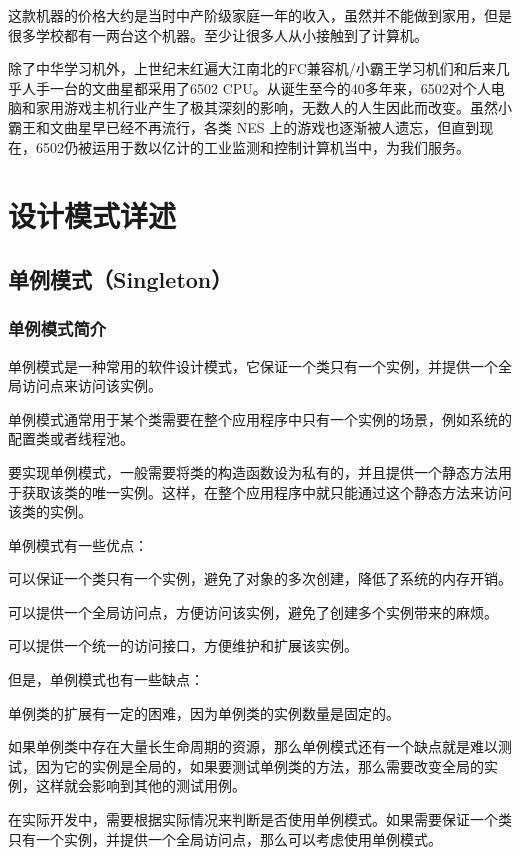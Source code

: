 \documentclass[cn,black,12pt,normal]{elegantnote}
\begin{document}
这款机器的价格大约是当时中产阶级家庭一年的收入，虽然并不能做到家用，但是很多学校都有一两台这个机器。至少让很多人从小接触到了计算机。

除了中华学习机外，上世纪末红遍大江南北的FC兼容机/小霸王学习机们和后来几乎人手一台的文曲星都采用了6502 CPU。从诞生至今的40多年来，6502对个人电脑和家用游戏主机行业产生了极其深刻的影响，无数人的人生因此而改变。虽然小霸王和文曲星早已经不再流行，各类 NES 上的游戏也逐渐被人遗忘，但直到现在，6502仍被运用于数以亿计的工业监测和控制计算机当中，为我们服务。

\newpage

\section{设计模式详述}

\subsection{单例模式（Singleton）}

\subsubsection{单例模式简介}

单例模式是一种常用的软件设计模式，它保证一个类只有一个实例，并提供一个全局访问点来访问该实例。

单例模式通常用于某个类需要在整个应用程序中只有一个实例的场景，例如系统的配置类或者线程池。

要实现单例模式，一般需要将类的构造函数设为私有的，并且提供一个静态方法用于获取该类的唯一实例。这样，在整个应用程序中就只能通过这个静态方法来访问该类的实例。

单例模式有一些优点：

可以保证一个类只有一个实例，避免了对象的多次创建，降低了系统的内存开销。

可以提供一个全局访问点，方便访问该实例，避免了创建多个实例带来的麻烦。

可以提供一个统一的访问接口，方便维护和扩展该实例。

但是，单例模式也有一些缺点：

单例类的扩展有一定的困难，因为单例类的实例数量是固定的。

如果单例类中存在大量长生命周期的资源，那么单例模式还有一个缺点就是难以测试，因为它的实例是全局的，如果要测试单例类的方法，那么需要改变全局的实例，这样就会影响到其他的测试用例。

在实际开发中，需要根据实际情况来判断是否使用单例模式。如果需要保证一个类只有一个实例，并提供一个全局访问点，那么可以考虑使用单例模式。
\end{document}
